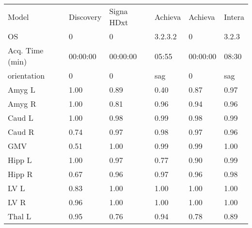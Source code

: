 \begin{table}
\begin{tabular}{llllll}
Model                 &              Discovery &         Signa HDxt &                            Achieva &            Achieva &                      Intera \\
OS                    &                      0 &                  0 &                            3.2.3.2 &                  0 &                       3.2.3 \\
Acq. Time (min)       &               00:00:00 &           00:00:00 &                           05:55 &           00:00:00 &                    08:30 \\
orientation           &                      0 &                  0 &                                sag &                  0 &                         sag \\
Amyg L                &                   1.00 &               0.89 &                               0.40 &               0.87 &                        0.97 \\
Amyg R                &                   1.00 &               0.81 &                               0.96 &               0.94 &                        0.96 \\
Caud L                &                   1.00 &               0.98 &                               0.99 &               0.98 &                        0.99 \\
Caud R                &                   0.74 &               0.97 &                               0.98 &               0.97 &                        0.96 \\
GMV                   &                   0.51 &               1.00 &                               0.99 &               0.99 &                        1.00 \\
Hipp L                &                   1.00 &               0.97 &                               0.77 &               0.90 &                        0.99 \\
Hipp R                &                   0.67 &               0.96 &                               0.97 &               0.96 &                        0.98 \\
LV L                  &                   0.83 &               1.00 &                               1.00 &               1.00 &                        1.00 \\
LV R                  &                   0.96 &               1.00 &                               1.00 &               1.00 &                        1.00 \\
Thal L                &                   0.95 &               0.76 &                               0.94 &               0.78 &                        0.89 \\

\end{tabular}
\end{table}
